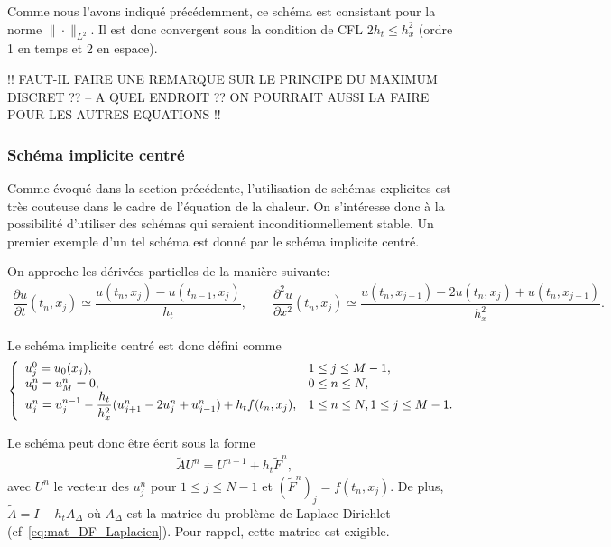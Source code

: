 \documentclass[12pt,a4paper,twoside]{article}
\begin{document}
Comme nous l'avons indiqu\'e pr\'ec\'edemment, ce sch\'ema est consistant pour la norme
$\| \cdot \|_{L^2}$. Il est donc convergent sous la condition de CFL $2 h_t \leq h_x^2$
(ordre 1 en temps et 2 en espace).

!! FAUT-IL FAIRE UNE REMARQUE SUR LE PRINCIPE DU MAXIMUM DISCRET ??
-- A QUEL ENDROIT ?? ON POURRAIT AUSSI LA FAIRE POUR LES AUTRES EQUATIONS !!

\subsubsection{Sch\'ema implicite centr\'e}
\label{subsubsec:chaleur_DF_implicite}


Comme \'evoqu\'e dans la section pr\'ec\'edente, l'utilisation de sch\'emas
explicites est tr\`es couteuse dans le cadre de l'\'equation de la chaleur.
On s'int\'eresse donc \`a la possibilit\'e d'utiliser des sch\'emas
qui seraient inconditionnellement stable.
Un premier exemple d'un tel sch\'ema est donn\'e par le sch\'ema 
implicite centr\'e.


On approche les d\'eriv\'ees partielles de la mani\`ere suivante:
\begin{align*}
  \dfrac{\partial u}{\partial t}(t_n,x_j) \simeq \dfrac{u(t_{n},x_j) - u(t_{n-1},x_j)}{h_t} ,
  \qquad 
  \dfrac{\partial^2 u}{\partial x^2}(t_n,x_j) 
  \simeq \dfrac{u(t_{n},x_{j+1}) - 2 u(t_n,x_j) + u(t_n,x_{j-1})}{h_x^2} .
\end{align*}




Le sch\'ema implicite centr\'e est donc d\'efini comme
\begin{align}
  \label{eq:chaleur_DF_imp_centre}
  \left\{
  \begin{array}{l l}
    u_j^0 = u_0(x_j) ,
    &1 \leq j \leq M-1,
    \\
    u_0^n = u_M^n = 0 ,
    &    0 \leq n \leq N, 
    \\
    u_j^{n} = u_j^{n-1} - \dfrac{h_t}{h_x^2} (u_{j+1}^{n} - 2 u_{j}^{n} + u_{j-1}^{n} ) 
    + h_t f(t_n,x_j) ,
    & 1 \leq n \leq N, 1 \leq j \leq M-1 .
  \end{array}
  \right.
\end{align}

Le sch\'ema peut donc \^etre \'ecrit sous la forme
\begin{align*}
  \widetilde{A} U^n = U^{n-1} + h_t \widetilde{F}^n ,
\end{align*}
avec $U^n$ le vecteur des $u_j^n$ pour $1 \leq j \leq N-1$ et $(\widetilde{F}^n)_j = f(t_n,x_j)$. 
De plus, $\widetilde{A} = I - h_t A_{\Delta}$ o\`u $A_{\Delta}$ est la matrice
du probl\`eme de Laplace-Dirichlet (cf~\eqref{eq:mat_DF_Laplacien}).
Pour rappel, cette matrice est exigible.
\end{document}
